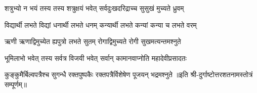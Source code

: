 \twolineshloka
{शत्रुभ्यो न भयं तस्य तस्य शत्रुक्षयं भवेत्}
{सर्वदुःखदरिद्राच्च सुसुखं मुच्यते ध्रुवम्}

\twolineshloka
{विद्यार्थी लभते विद्यां धनार्थी लभते धनम्}
{कन्यार्थी लभते कन्यां कन्या च लभते वरम्}

\twolineshloka
{ऋणी ऋणाद्विमुच्येत ह्यपुत्रो लभते सुतम्}
{रोगाद्विमुच्यते रोगी सुखमत्यन्तमश्नुते}

\twolineshloka
{भूमिलाभो भवेत् तस्य सर्वत्र विजयी भवेत्}
{सर्वान् कामानवाप्नोति महादेवीप्रसादतः}

\twolineshloka
{कुङ्कुमैर्बिल्वपत्रैश्च सुगन्धै रक्तपुष्पकैः}
{रक्तपत्रैर्विशेषेण पूजयन् भद्रमश्नुते}
॥इति श्री-दुर्गाष्टोत्तरशतनामस्तोत्रं सम्पूर्णम्॥
